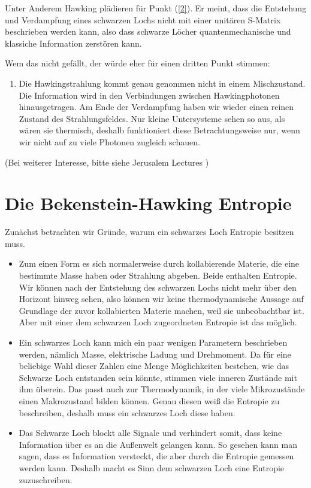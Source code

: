 \documentclass[ngerman]{scrartcl}
\begin{document}
Unter Anderem Hawking plädieren für Punkt (\ref{2}). Er meint, dass die Entstehung und Verdampfung eines schwarzen Lochs nicht mit einer unitären S-Matrix beschrieben werden kann, also dass schwarze Löcher quantenmechanische und klassiche Information zerstören kann. 

Wem das nicht gefällt, der würde eher für einen dritten Punkt stimmen:
	\begin{enumerate}[(3)]
		\item Die Hawkingstrahlung kommt genau genommen nicht in einem Mischzustand. Die Information wird in den Verbindungen zwischen Hawkingphotonen hinausgetragen. Am Ende der Verdampfung haben wir wieder einen reinen Zustand des Strahlungsfeldes. Nur kleine Untersysteme sehen so aus, als wären sie thermisch, deshalb funktioniert diese Betrachtungsweise nur, wenn wir nicht auf zu viele Photonen zugleich schauen. 
	\end{enumerate}   
(Bei weiterer Interesse, bitte siehe Jerusalem Lectures \cite{JerusalemsLectures})

\section{Die Bekenstein-Hawking Entropie} \label{BHEntropie}
Zunächst betrachten wir Gründe, warum ein schwarzes Loch Entropie besitzen muss. 
	\begin{itemize}
		\item Zum einen Form es sich normalerweise durch kollabierende Materie, die eine 	bestimmte Masse haben oder Strahlung abgeben. Beide enthalten 		Entropie. Wir können nach der Entstehung des schwarzen Lochs nicht mehr über den Horizont hinweg sehen, also können wir keine thermodynamische Aussage auf Grundlage der zuvor kollabierten Materie machen, weil sie unbeobachtbar ist. Aber mit einer dem schwarzen Loch zugeordneten Entropie ist das möglich.
		
		\item Ein schwarzes Loch kann mich ein paar wenigen Parametern beschrieben werden, nämlich Masse, elektrische Ladung und Drehmoment. Da für eine beliebige Wahl dieser Zahlen eine Menge Möglichkeiten bestehen, wie das Schwarze Loch entstanden sein könnte, stimmen viele inneren Zustände mit ihm überein. Das passt auch zur Thermodynamik, in der viele Mikrozustände einen Makrozustand bilden können. Genau diesen weiß die Entropie zu beschreiben, deshalb muss ein schwarzes Loch diese haben. 
		
		\item Das Schwarze Loch blockt alle Signale und verhindert somit, dass keine Information über es an die Außenwelt gelangen kann. So gesehen kann man sagen, dass es Information versteckt, die aber durch die Entropie gemessen werden kann. Deshalb macht es Sinn dem schwarzen Loch eine Entropie zuzuschreiben. 
	\end{itemize}
	
\end{document}
